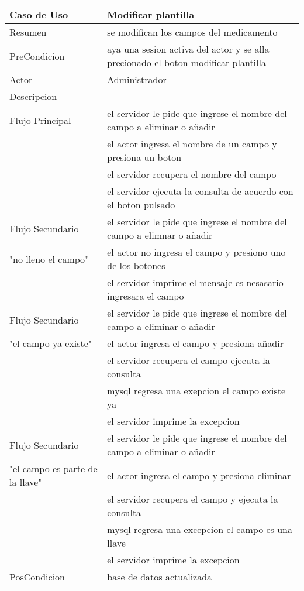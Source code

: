 \documentclass{book}
\begin{document}
	\begin{table}[H]
		\centering
		\begin{tabular}{p{3cm} p{11cm}}
			\hline
				Caso de Uso & Modificar plantilla\\
			\hline 
				Resumen & se modifican los campos del medicamento\\
			\hline
				PreCondicion& aya una sesion activa del actor y se alla precionado el boton modificar plantilla\\
			\hline
				Actor & Administrador\\
			\hline
				Descripcion&\\
				Flujo Principal&el servidor le pide que ingrese el nombre del campo a eliminar o añadir
					\\&el actor ingresa el nombre de un campo y presiona un boton
					\\&el servidor recupera el nombre del campo
					\\&el servidor ejecuta la consulta de acuerdo con el boton pulsado\\
			\hline
				Flujo Secundario&el servidor le pide que ingrese el nombre del campo a elimnar o añadir\\
					"no lleno el campo"&el actor no ingresa el campo y presiono uno de los botones
					\\&el servidor imprime el mensaje es nesasario ingresara el campo\\
			\hline
				Flujo Secundario&el servidor le pide que ingrese el nombre del campo a eliminar o añadir\\
					"el campo ya existe"&el actor ingresa el campo y presiona añadir	
					\\&el servidor recupera el campo ejecuta la consulta
					\\&mysql regresa una exepcion el campo existe ya
					\\&el servidor imprime la excepcion\\
			\hline
				Flujo Secundario&el servidor le pide que ingrese el nombre del campo a eliminar o añadir\\
					"el campo es parte de la llave"&el actor ingresa el campo y presiona eliminar
					\\&el servidor recupera el campo y ejecuta la consulta
					\\&mysql regresa una excepcion el campo es una llave
					\\&el servidor imprime la excepcion\\
			\hline
				PosCondicion&base de datos actualizada\\
			\hline
		\end{tabular}
	\end{table}
\end{document}
